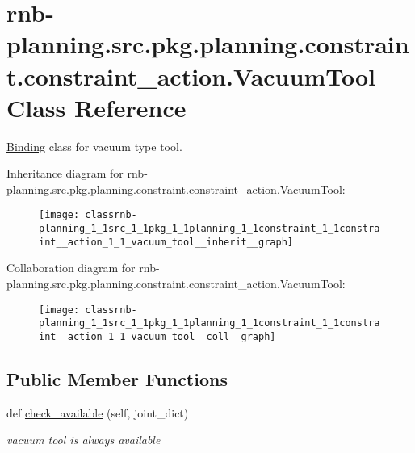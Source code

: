 \hypertarget{classrnb-planning_1_1src_1_1pkg_1_1planning_1_1constraint_1_1constraint__action_1_1_vacuum_tool}{}\section{rnb-\/planning.src.\+pkg.\+planning.\+constraint.\+constraint\+\_\+action.\+Vacuum\+Tool Class Reference}
\label{classrnb-planning_1_1src_1_1pkg_1_1planning_1_1constraint_1_1constraint__action_1_1_vacuum_tool}


\hyperlink{classrnb-planning_1_1src_1_1pkg_1_1planning_1_1constraint_1_1constraint__action_1_1_binding}{Binding} class for vacuum type tool.  




Inheritance diagram for rnb-\/planning.src.\+pkg.\+planning.\+constraint.\+constraint\+\_\+action.\+Vacuum\+Tool\+:\nopagebreak
\begin{figure}[H]
\begin{center}
\leavevmode
\texttt{[image: classrnb-planning\_1\_1src\_1\_1pkg\_1\_1planning\_1\_1constraint\_1\_1constraint\_\_action\_1\_1\_vacuum\_tool\_\_inherit\_\_graph]}
\end{center}
\end{figure}


Collaboration diagram for rnb-\/planning.src.\+pkg.\+planning.\+constraint.\+constraint\+\_\+action.\+Vacuum\+Tool\+:\nopagebreak
\begin{figure}[H]
\begin{center}
\leavevmode
\texttt{[image: classrnb-planning\_1\_1src\_1\_1pkg\_1\_1planning\_1\_1constraint\_1\_1constraint\_\_action\_1\_1\_vacuum\_tool\_\_coll\_\_graph]}
\end{center}
\end{figure}
\subsection*{Public Member Functions}
\begin{DoxyCompactItemize}
\item 
\mbox{\label{classrnb-planning_1_1src_1_1pkg_1_1planning_1_1constraint_1_1constraint__action_1_1_vacuum_tool_af45b379bdb3a9cbd67e59c7272a368fd}} 
def \hyperlink{classrnb-planning_1_1src_1_1pkg_1_1planning_1_1constraint_1_1constraint__action_1_1_vacuum_tool_af45b379bdb3a9cbd67e59c7272a368fd}{check\+\_\+available} (self, joint\+\_\+dict)
\begin{DoxyCompactList}\small\item\em vacuum tool is always available \end{DoxyCompactList}\end{DoxyCompactItemize}
